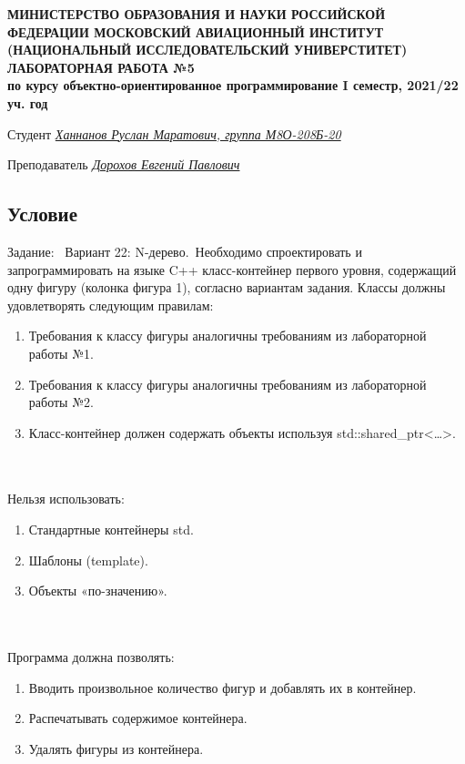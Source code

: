 \documentclass[12pt]{article}
\begin{document}
\begin{titlepage}
\begin{center}
\textbf{МИНИСТЕРСТВО ОБРАЗОВАНИЯ И НАУКИ РОССИЙСКОЙ ФЕДЕРАЦИИ
\medskip
МОСКОВСКИЙ АВИАЦИОННЫЙ ИНСТИТУТ
(НАЦИОНАЛЬНЫЙ ИССЛЕДОВАТЕЛЬСКИЙ УНИВЕРСТИТЕТ)
\vfill\vfill
{\Huge ЛАБОРАТОРНАЯ РАБОТА №5} \\
по курсу объектно-ориентированное программирование
I семестр, 2021/22 уч. год}
\end{center}
\vfill

Студент \uline{\it {Ханнанов Руслан Маратович, группа М8О-208Б-20}\hfill}

Преподаватель \uline{\it {Дорохов Евгений Павлович}\hfill}

\vfill
\end{titlepage}

\subsection*{Условие}

Задание: \
Вариант 22: N-дерево.\
Необходимо спроектировать и запрограммировать на языке C++ класс-контейнер первого уровня, содержащий одну фигуру (колонка фигура 1), согласно вариантам задания. Классы должны удовлетворять следующим правилам:
\begin{enumerate}
\item Требования к классу фигуры аналогичны требованиям из лабораторной работы №1.
\item Требования к классу фигуры аналогичны требованиям из лабораторной работы №2.
\item Класс-контейнер должен содержать объекты используя std::shared\_ptr<…>.
\end{enumerate}
\\ \\
Нельзя использовать:
\begin{enumerate}
\item Стандартные контейнеры std.
\item Шаблоны (template).
\item Объекты «по-значению».
\end{enumerate}
\\ \\
Программа должна позволять:
\begin{enumerate}
\item Вводить произвольное количество фигур и добавлять их в контейнер.
\item Распечатывать содержимое контейнера.
\item Удалять фигуры из контейнера.
\end{enumerate}
\end{document}
